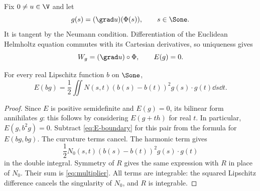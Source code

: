 Fix $0\ne u\in\V$ and let
\begin{equation}\label{eq:g}
g(s)=(\grad u)(\Phi(s)),\qquad s\in\Sone.
\end{equation}
It is tangent by the Neumann condition. Differentiation of the Euclidean Helmholtz equation commutes with its Cartesian derivatives, so uniqueness gives
\begin{equation}\label{eq:gradient-extension}
W_g=(\grad u)\circ\Phi,
\qquad E(g)=0.
\end{equation}

\begin{proposition}\label{prop:multiplier}
For every real Lipschitz function $b$ on $\Sone$,
\begin{equation}\label{eq:multiplier}
E(bg)=\frac12\iint N(s,t)(b(s)-b(t))^2
g(s)\cdot g(t)\dd s\dd t.
\end{equation}
\end{proposition}
\begin{proof}
Since $E$ is positive semidefinite and $E(g)=0$, its bilinear form annihilates $g$: this follows by considering $E(g+th)$ for real $t$. In particular, $E(g,b^2g)=0$. Subtract \eqref{eq:E-boundary} for this pair from the formula for $E(bg,bg)$. The curvature terms cancel. The harmonic term gives
\[
\frac12N_0(s,t)(b(s)-b(t))^2g(s)\cdot g(t)
\]
in the double integral. Symmetry of $R$ gives the same expression with $R$ in place of $N_0$. Their sum is \eqref{eq:multiplier}. All terms are integrable: the squared Lipschitz difference cancels the singularity of $N_0$, and $R$ is integrable.
\end{proof}


